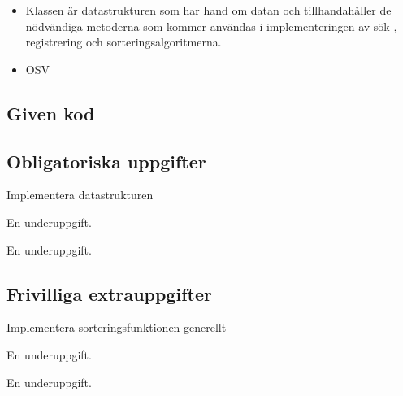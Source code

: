 \begin{itemize}
\item Klassen  är datastrukturen som har hand om datan och tillhandahåller de nödvändiga metoderna som kommer användas i implementeringen av sök-, registrering och sorteringsalgoritmerna.
\item OSV
\end{itemize}

\subsection{Given kod}


\subsection{Obligatoriska uppgifter}

\Task Implementera datastrukturen

\Subtask En underuppgift.

\Subtask En underuppgift.

\subsection{Frivilliga extrauppgifter}

\Task Implementera sorteringsfunktionen generellt

\Subtask En underuppgift.

\Subtask En underuppgift.
    